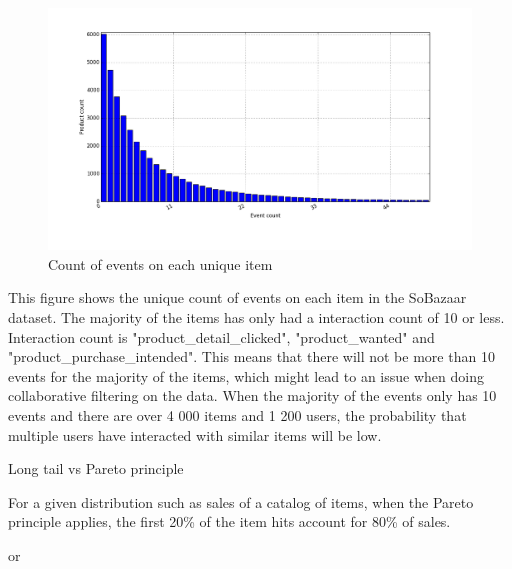    \begin{figure}[H]
        \includegraphics[width=5in]{image/product_idcumdistribution.png}
        \centering
        \caption{Count of events on each unique item}
    \label{figure:eventOnProductDist}
    \end{figure}
        This figure shows the unique count of events on each item in the SoBazaar dataset.
        The majority of the items has only had a interaction count of 10 or less.
        Interaction count is "product\_detail\_clicked", "product\_wanted" and "product\_purchase\_intended".
        This means that there will not be more than 10 events for the majority of the items, which might lead to an issue when doing collaborative filtering on the data.
        When the majority of the events only has 10 events and there are over 4 000 items and 1 200 users, the probability that multiple users have interacted with similar items will be low.

    Long tail vs Pareto principle

    For a given distribution such as sales of a catalog of items, when the Pareto principle applies, the first 20\% of the item hits account for 80\% of sales.

    or

